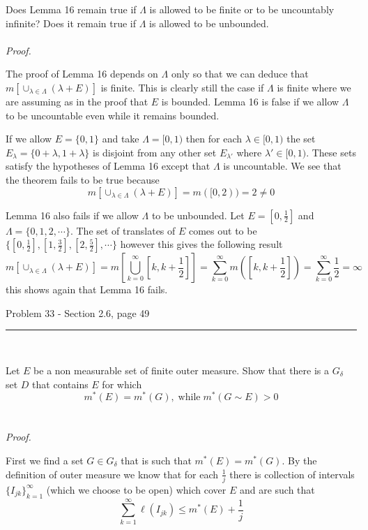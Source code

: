 \documentclass[11pt,reqno]{article}
\begin{document}
Does Lemma 16 remain true if $\Lambda$ is allowed to be finite or to be uncountably infinite? Does it remain true if $\Lambda$ is allowed to be unbounded.
\\\\ \emph{Proof.}

The proof of Lemma 16 depends on $\Lambda$ only so that we can deduce that $ m \left[ \cup_{\lambda \in \Lambda} (\lambda + E) \right]$ is finite. This is clearly still the case if $\Lambda$ is finite where we are assuming as in the proof that $E$ is bounded. Lemma 16 is false if we allow $\Lambda$ to be uncountable even while it remains bounded.

If we allow $E = \{ 0, 1 \}$ and take $\Lambda = [0, 1)$ then for each $\lambda \in [0, 1)$ the set $E_\lambda = \{0 + \lambda, 1 + \lambda \}$ is disjoint from any other set $E_{\lambda'}$ where $\lambda' \in [0, 1)$. These sets satisfy the hypotheses of Lemma 16 except that $\Lambda$ is uncountable. We see that the theorem fails to be true because 
\[ m \left[ \cup_{\lambda \in \Lambda} (\lambda + E) \right] = m([0, 2)) = 2 \neq 0\]

Lemma 16 also fails if we allow $\Lambda$ to be unbounded. Let $E = [0, \frac{1}{2}]$ and $\Lambda = \{0,1,2,\cdots \}$. The set of translates of $E$ comes out to be $\{ [0,\frac{1}{2}], [1, \frac{3}{2}], [2, \frac{5}{2}], \cdots  \}$ however this gives the following result
\[  m \left[ \cup_{\lambda \in \Lambda} (\lambda + E) \right]  = m \left[ \bigcup_{k = 0}^\infty [k, k + \frac{1}{2}] \right] =  \sum_{k = 0}^\infty m([k, k + \frac{1}{2}]) = \sum_{k = 0}^\infty \frac{1}{2} = \infty \]
this shows again that Lemma 16 fails.

\begin{flushleft} 
Problem 33 - Section 2.6, page 49\\
\rule{500pt}{1pt}\\
\end{flushleft} 

Let $E$ be a non measurable set of finite outer measure. Show that there is a $G_\delta$ set $D$ that contains $E$ for which  \[ m^*(E) = m^*(G), \; \text{while} \; m^*(G \sim E) > 0 \]
\\\\ \emph{Proof.}

First we find a set $G \in G_\delta$ that is such that $m^*(E) = m^*(G)$. By the definition of outer measure we know that for each $\frac{1}{j}$ there is collection of intervals $\{ I_{jk} \} _{ k = 1}^\infty$ (which we choose to be open) which cover $E$ and are such that 
\[ \sum_{k=1}^\infty \ell(I_{jk}) \le m^*(E) + \frac{1}{j} \]
\end{document}
